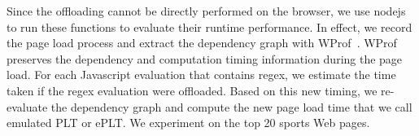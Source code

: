 Since the offloading cannot be directly performed on the browser, we use nodejs to run these functions to evaluate their runtime performance. In effect, we record the page load process and extract the dependency graph with WProf~\cite{wang2013demystifying}. WProf preserves the dependency and computation timing information during the page load. For each Javascript evaluation that contains regex, we estimate the time taken if the regex evaluation were offloaded. Based on this new timing, we re-evaluate the dependency graph and compute the new page load time that we call emulated PLT or ePLT. We experiment on the top 20 sports Web pages.






